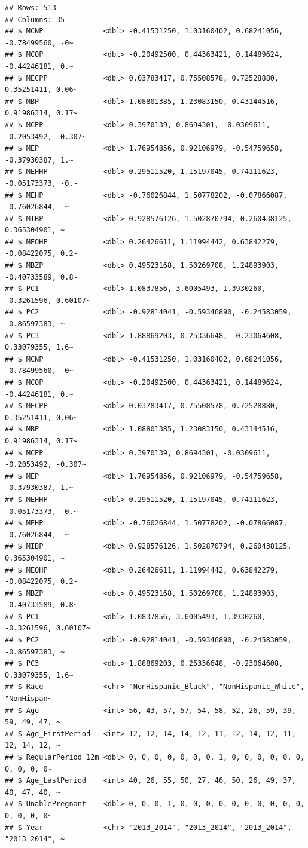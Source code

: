 \documentclass[
]{article}
\begin{document}
\begin{verbatim}
## Rows: 513
## Columns: 35
## $ MCNP              <dbl> -0.41531250, 1.03160402, 0.68241056, -0.78499560, -0~
## $ MCOP              <dbl> -0.20492500, 0.44363421, 0.14489624, -0.44246181, 0.~
## $ MECPP             <dbl> 0.03783417, 0.75508578, 0.72528880, 0.35251411, 0.06~
## $ MBP               <dbl> 1.08801385, 1.23083150, 0.43144516, 0.91986314, 0.17~
## $ MCPP              <dbl> 0.3970139, 0.8694301, -0.0309611, -0.2053492, -0.307~
## $ MEP               <dbl> 1.76954856, 0.92106979, -0.54759658, -0.37930387, 1.~
## $ MEHHP             <dbl> 0.29511520, 1.15197045, 0.74111623, -0.05173373, -0.~
## $ MEHP              <dbl> -0.76026844, 1.50778202, -0.07866087, -0.76026844, -~
## $ MIBP              <dbl> 0.928576126, 1.502870794, 0.260438125, 0.365304901, ~
## $ MEOHP             <dbl> 0.26426611, 1.11994442, 0.63842279, -0.08422075, 0.2~
## $ MBZP              <dbl> 0.49523168, 1.50269708, 1.24893903, -0.40733589, 0.8~
## $ PC1               <dbl> 1.0837856, 3.6005493, 1.3930260, -0.3261596, 0.60107~
## $ PC2               <dbl> -0.92814041, -0.59346890, -0.24583059, -0.86597383, ~
## $ PC3               <dbl> 1.88869203, 0.25336648, -0.23064608, 0.33079355, 1.6~
## $ MCNP              <dbl> -0.41531250, 1.03160402, 0.68241056, -0.78499560, -0~
## $ MCOP              <dbl> -0.20492500, 0.44363421, 0.14489624, -0.44246181, 0.~
## $ MECPP             <dbl> 0.03783417, 0.75508578, 0.72528880, 0.35251411, 0.06~
## $ MBP               <dbl> 1.08801385, 1.23083150, 0.43144516, 0.91986314, 0.17~
## $ MCPP              <dbl> 0.3970139, 0.8694301, -0.0309611, -0.2053492, -0.307~
## $ MEP               <dbl> 1.76954856, 0.92106979, -0.54759658, -0.37930387, 1.~
## $ MEHHP             <dbl> 0.29511520, 1.15197045, 0.74111623, -0.05173373, -0.~
## $ MEHP              <dbl> -0.76026844, 1.50778202, -0.07866087, -0.76026844, -~
## $ MIBP              <dbl> 0.928576126, 1.502870794, 0.260438125, 0.365304901, ~
## $ MEOHP             <dbl> 0.26426611, 1.11994442, 0.63842279, -0.08422075, 0.2~
## $ MBZP              <dbl> 0.49523168, 1.50269708, 1.24893903, -0.40733589, 0.8~
## $ PC1               <dbl> 1.0837856, 3.6005493, 1.3930260, -0.3261596, 0.60107~
## $ PC2               <dbl> -0.92814041, -0.59346890, -0.24583059, -0.86597383, ~
## $ PC3               <dbl> 1.88869203, 0.25336648, -0.23064608, 0.33079355, 1.6~
## $ Race              <chr> "NonHispanic_Black", "NonHispanic_White", "NonHispan~
## $ Age               <int> 56, 43, 57, 57, 54, 58, 52, 26, 59, 39, 59, 49, 47, ~
## $ Age_FirstPeriod   <int> 12, 12, 14, 14, 12, 11, 12, 14, 12, 11, 12, 14, 12, ~
## $ RegularPeriod_12m <dbl> 0, 0, 0, 0, 0, 0, 0, 1, 0, 0, 0, 0, 0, 0, 0, 0, 0, 0~
## $ Age_LastPeriod    <int> 40, 26, 55, 50, 27, 46, 50, 26, 49, 37, 40, 47, 40, ~
## $ UnablePregnant    <dbl> 0, 0, 0, 1, 0, 0, 0, 0, 0, 0, 0, 0, 0, 0, 0, 0, 0, 0~
## $ Year              <chr> "2013_2014", "2013_2014", "2013_2014", "2013_2014", ~
\end{verbatim}
\end{document}
